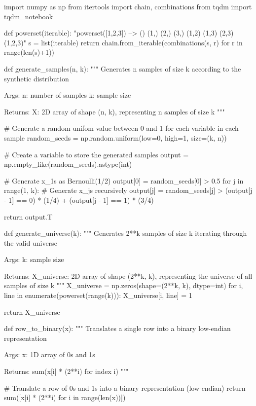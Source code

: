 \begin{python}
import numpy as np
from itertools import chain, combinations
from tqdm import tqdm_{n}otebook

def powerset(iterable):
    "powerset([1,2,3]) --> () (1,) (2,) (3,) (1,2) (1,3) (2,3) (1,2,3)"
    s = list(iterable)
    return chain.from_{i}terable(combinations(s, r) for r in range(len(s)+1))


def generate_samples(n, k):
    """
    Generates n samples of size k according to the synthetic distribution
    
    Args:
       n:  number of samples
       k:  sample size
       
    Returns:
       X:  2D array of shape (n, k), representing n samples of size k
    """
    
    # Generate a random unifom value between 0 and 1 for each variable in each sample
    random_seeds = np.random.uniform(low=0, high=1, size=(k, n))
    
    # Create a variable to store the generated samples
    output = np.empty_like(random_seeds).astype(int)
    
    # Generate x_{1}s as Bernoulli(1/2)
    output[0] = random_seeds[0] > 0.5
    for j in range(1, k):
        # Generate x_{j}s recursively
        output[j] = random_seeds[j] > (output[j - 1] == 0) * (1/4) + (output[j - 1] == 1) * (3/4)
        
    return output.T


def generate_universe(k):
    """
    Generates 2**k samples of size k iterating through the valid universe
    
    Args:
       k: sample size
       
    Returns:
       X_universe:  2D array of shape (2**k, k), representing the universe of all samples of size k
    """
    X_universe = np.zeros(shape=(2**k, k), dtype=int)
    for i, line in enumerate(powerset(range(k))):
        X_universe[i, line] = 1
        
    return X_universe


def row_to_binary(x):
    """
    Translates a single row into a binary low-endian representation
    
    Args:
       x:  1D array of 0s and 1s
       
    Returns:
       sum(x[i] * (2**i) for index i)
    """
    
    # Translate a row of 0s and 1s into a binary representation (low-endian)
    return sum([x[i] * (2**i) for i in range(len(x))])



\end{python}
